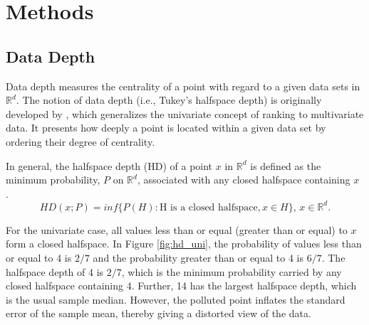 \documentclass[a4paper,UKenglish]{lipics-v2016}
\begin{document}
%
%


\section{Methods}
\label{sec:methods}

\subsection{Data Depth}
Data depth measures the centrality of a point with regard to a given data sets in $\mathbb{R}^d$. The notion of data depth (i.e., Tukey's halfspace depth) is originally developed by \cite{tukey75ICM}, which generalizes the univariate concept of ranking to multivariate data. It presents how deeply a point is located within a given data set by ordering their degree of centrality. 

In general, the halfspace depth (HD) of a point $x$ in $\mathbb{R}^d$ is defined as the minimum probability, $P$ on $\mathbb{R}^d$, associated with any closed halfspace containing $x$ \cite{liu00AS}. 
\begin{equation*}\label{eq:hd}
HD(x;P) = inf\{P(H): \text{H is a closed halfspace}, x \in H\}\text{, } x \in \mathbb{R}^d.
\end{equation*}

For the univariate case, all values less than or equal (greater than or equal) to $x$ form a closed halfspace. 
In Figure \ref{fig:hd_uni}, the probability of values less than or equal to 4 is $2/7$ and the probability greater than or equal to 4 is $6/7$. The halfspace depth of 4 is $2/7$, which is the minimum probability carried by any closed halfspace containing 4. Further, 14 has the largest halfspace depth, which is the usual sample median. However, the polluted point inflates the standard error of the sample mean, thereby giving a distorted view of the data. 
\end{document}

